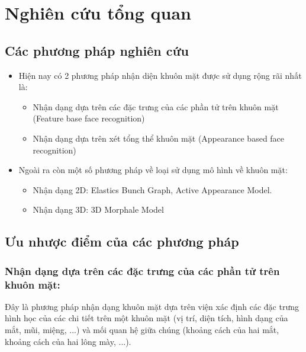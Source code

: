 \chapter{Nghiên cứu tổng quan}
\label{cha: chap1}

\section{Các phương pháp nghiên cứu}

\begin{itemize}
    \item Hiện nay có 2 phương pháp nhận diện khuôn mặt được sử dụng rộng rãi nhất là:
          \begin{itemize}
              \item Nhận dạng dựa trên các đặc trưng của các phần tử trên khuôn mặt
                    (Feature base face recognition)
              \item Nhận dạng dựa trên xét tổng thể khuôn mặt (Appearance based face
                    recognition)
          \end{itemize}

    \item Ngoài ra còn một số phương pháp về loại sử dụng mô hình về khuôn mặt:
          \begin{itemize}
              \item Nhận dạng 2D: Elastics Bunch Graph, Active Appearance Model.
              \item Nhận dạng 3D: 3D Morphale Model
          \end{itemize}
\end{itemize}

\section{Ưu nhược điểm của các phương pháp}
\subsection{Nhận dạng dựa trên các đặc trưng của các phần tử trên khuôn mặt: }

Đây là phương pháp nhận dạng khuôn mặt dựa trên viện xác định các đặc trưng hình
học của các chi tiết trên một khuôn mặt (vị trí, diện tích, hình dạng của mắt,
mũi, miệng, ...) và mối quan hệ giữa chúng (khoảng cách của hai mắt, khoảng cách
của hai lông mày, ...).

